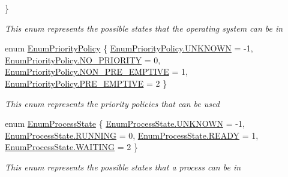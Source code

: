 \begin{DoxyCompactItemize}
 \}\begin{DoxyCompactList}\small\item\em This enum represents the possible states that the operating system can be in \end{DoxyCompactList}
\item 
enum \hyperlink{namespace_c_p_u___o_s___simulator_1_1_operating___system_a3a9286a473bd079e9c65908c0378fa00}{Enum\+Priority\+Policy} \{ \hyperlink{namespace_c_p_u___o_s___simulator_1_1_operating___system_a3a9286a473bd079e9c65908c0378fa00a696b031073e74bf2cb98e5ef201d4aa3}{Enum\+Priority\+Policy.\+U\+N\+K\+N\+O\+W\+N} = -\/1, 
\hyperlink{namespace_c_p_u___o_s___simulator_1_1_operating___system_a3a9286a473bd079e9c65908c0378fa00a9f68f1d26dd059f9a73e5f66a83bef80}{Enum\+Priority\+Policy.\+N\+O\+\_\+\+P\+R\+I\+O\+R\+I\+T\+Y} = 0, 
\hyperlink{namespace_c_p_u___o_s___simulator_1_1_operating___system_a3a9286a473bd079e9c65908c0378fa00a991a81df1486f1b97a90776f3026ff96}{Enum\+Priority\+Policy.\+N\+O\+N\+\_\+\+P\+R\+E\+\_\+\+E\+M\+P\+T\+I\+V\+E} = 1, 
\hyperlink{namespace_c_p_u___o_s___simulator_1_1_operating___system_a3a9286a473bd079e9c65908c0378fa00a952140b26aa6080871aab2eb7a96feb0}{Enum\+Priority\+Policy.\+P\+R\+E\+\_\+\+E\+M\+P\+T\+I\+V\+E} = 2
 \}\begin{DoxyCompactList}\small\item\em This enum represents the priority policies that can be used \end{DoxyCompactList}
\item 
enum \hyperlink{namespace_c_p_u___o_s___simulator_1_1_operating___system_a836ee2204e78fcb3a7dd6c3c942b1a24}{Enum\+Process\+State} \{ \hyperlink{namespace_c_p_u___o_s___simulator_1_1_operating___system_a836ee2204e78fcb3a7dd6c3c942b1a24a696b031073e74bf2cb98e5ef201d4aa3}{Enum\+Process\+State.\+U\+N\+K\+N\+O\+W\+N} = -\/1, 
\hyperlink{namespace_c_p_u___o_s___simulator_1_1_operating___system_a836ee2204e78fcb3a7dd6c3c942b1a24a43491564ebcfd38568918efbd6e840fd}{Enum\+Process\+State.\+R\+U\+N\+N\+I\+N\+G} = 0, 
\hyperlink{namespace_c_p_u___o_s___simulator_1_1_operating___system_a836ee2204e78fcb3a7dd6c3c942b1a24a2baa69eafc7204f3bd8648eba580c489}{Enum\+Process\+State.\+R\+E\+A\+D\+Y} = 1, 
\hyperlink{namespace_c_p_u___o_s___simulator_1_1_operating___system_a836ee2204e78fcb3a7dd6c3c942b1a24a1869d56535e8b1449a6da54ff5e11f50}{Enum\+Process\+State.\+W\+A\+I\+T\+I\+N\+G} = 2
 \}\begin{DoxyCompactList}\small\item\em This enum represents the possible states that a process can be in \end{DoxyCompactList}

\end{DoxyCompactItemize}
